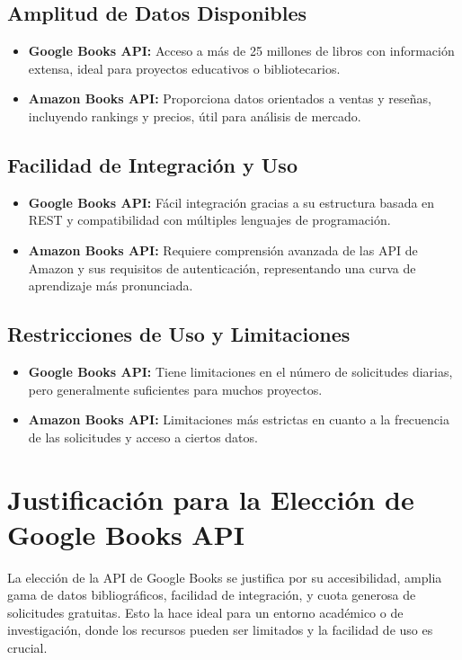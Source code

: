 \subsection{Amplitud de Datos Disponibles}
\begin{itemize}
    \item \textbf{Google Books API:} Acceso a más de 25 millones de libros con información extensa, ideal para proyectos educativos o bibliotecarios.
    \item \textbf{Amazon Books API:} Proporciona datos orientados a ventas y reseñas, incluyendo rankings y precios, útil para análisis de mercado.
\end{itemize}

\subsection{Facilidad de Integración y Uso}
\begin{itemize}
    \item \textbf{Google Books API:} Fácil integración gracias a su estructura basada en REST y compatibilidad con múltiples lenguajes de programación.
    \item \textbf{Amazon Books API:} Requiere comprensión avanzada de las API de Amazon y sus requisitos de autenticación, representando una curva de aprendizaje más pronunciada.
\end{itemize}

\subsection{Restricciones de Uso y Limitaciones}
\begin{itemize}
    \item \textbf{Google Books API:} Tiene limitaciones en el número de solicitudes diarias, pero generalmente suficientes para muchos proyectos.
    \item \textbf{Amazon Books API:} Limitaciones más estrictas en cuanto a la frecuencia de las solicitudes y acceso a ciertos datos.
\end{itemize}

\section{Justificación para la Elección de Google Books API}
La elección de la API de Google Books se justifica por su accesibilidad, amplia gama de datos bibliográficos, facilidad de integración, y cuota generosa de solicitudes gratuitas. Esto la hace ideal para un entorno académico o de investigación, donde los recursos pueden ser limitados y la facilidad de uso es crucial.










